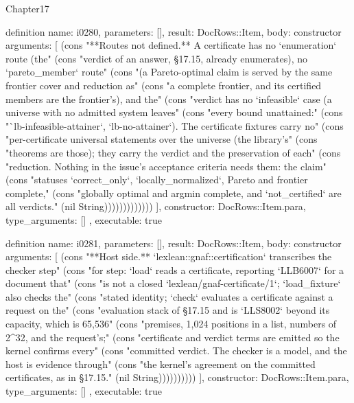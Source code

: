 \begin{lexlean}{Chapter17}
\begin{semanticmodule}
definition{
  name: i0280,
  parameters: [],
  result: DocRows::Item,
  body: constructor{
    arguments: [
      (cons "**Routes not defined.** A certificate has no `enumeration` route (the" (cons "verdict of an answer, §17.15, already enumerates), no `pareto_member` route" (cons "(a Pareto-optimal claim is served by the same frontier cover and reduction as" (cons "a complete frontier, and its certified members are the frontier's), and the" (cons "verdict has no `infeasible` case (a universe with no admitted system leaves" (cons "every bound unattained:" (cons "`lb-infeasible-attainer`, `lb-no-attainer`). The certificate fixtures carry no" (cons "per-certificate universal statements over the universe (the library's" (cons "theorems are those); they carry the verdict and the preservation of each" (cons "reduction. Nothing in the issue's acceptance criteria needs them: the claim" (cons "statuses `correct_only`, `locally_normalized`, Pareto and frontier complete," (cons "globally optimal and argmin complete, and `not_certified` are all verdicts." (nil String)))))))))))))
    ],
    constructor: DocRows::Item.para,
    type_arguments: []
  },
  executable: true
}

definition{
  name: i0281,
  parameters: [],
  result: DocRows::Item,
  body: constructor{
    arguments: [
      (cons "**Host side.** `lexlean::gnaf::certification` transcribes the checker step" (cons "for step: `load` reads a certificate, reporting `LLB6007` for a document that" (cons "is not a closed `lexlean/gnaf-certificate/1`; `load_fixture` also checks the" (cons "stated identity; `check` evaluates a certificate against a request on the" (cons "evaluation stack of §17.15 and is `LLS8002` beyond its capacity, which is 65,536" (cons "premises, 1,024 positions in a list, numbers of 2^32, and the request's;" (cons "certificate and verdict terms are emitted so the kernel confirms every" (cons "committed verdict. The checker is a model, and the host is evidence through" (cons "the kernel's agreement on the committed certificates, as in §17.15." (nil String))))))))))
    ],
    constructor: DocRows::Item.para,
    type_arguments: []
  },
  executable: true
}


\end{semanticmodule}
\end{lexlean}
